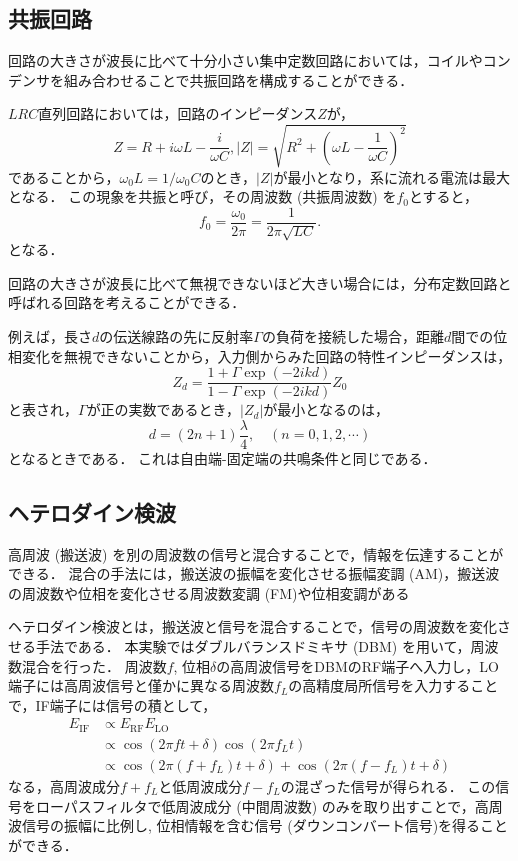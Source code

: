 \documentclass[uplatex,dvipdfmx,a4j,12pt]{jsarticle}
\begin{document}
\subsection{共振回路}
回路の大きさが波長に比べて十分小さい集中定数回路においては，コイルやコンデンサを組み合わせることで共振回路を構成することができる．

$LRC$直列回路においては，回路のインピーダンス$Z$が，
\begin{equation}
  Z = R + i\omega L - \frac{i}{\omega C}, |Z| = \sqrt{R^2 + \left(\omega L - \frac{1}{\omega C}\right)^2}
\end{equation}
であることから，$\omega_0 L = 1/\omega_0 C$のとき，$|Z|$が最小となり，系に流れる電流は最大となる．
この現象を共振と呼び，その周波数 (共振周波数) を$f_0$とすると，
\begin{equation}
  f_0 = \frac{\omega_0}{2\pi} = \frac{1}{2\pi\sqrt{LC}}.\label{eq:resonance_frequency}
\end{equation}
となる．

回路の大きさが波長に比べて無視できないほど大きい場合には，分布定数回路と呼ばれる回路を考えることができる．

例えば，長さ$d$の伝送線路の先に反射率$\Gamma$の負荷を接続した場合，距離$d$間での位相変化を無視できないことから，入力側からみた回路の特性インピーダンスは，
\begin{equation}
  Z_d = \frac{1+\Gamma \exp{(-2ikd)}}{1-\Gamma \exp{(-2ikd)}}Z_0
\end{equation}
と表され，$\Gamma$が正の実数であるとき，$|Z_d|$が最小となるのは，
\begin{equation}
  d = (2n + 1)\frac{\lambda}{4}, \quad (n = 0, 1, 2, \cdots)\label{eq:resonance_length}
\end{equation}
となるときである．
これは自由端-固定端の共鳴条件と同じである．

\subsection{ヘテロダイン検波}
高周波 (搬送波) を別の周波数の信号と混合することで，情報を伝達することができる．
混合の手法には，搬送波の振幅を変化させる振幅変調 (AM)，搬送波の周波数や位相を変化させる周波数変調 (FM)や位相変調がある

ヘテロダイン検波とは，搬送波と信号を混合することで，信号の周波数を変化させる手法である．
本実験ではダブルバランスドミキサ (DBM) を用いて，周波数混合を行った．
周波数$f$, 位相$\delta$の高周波信号をDBMのRF端子へ入力し，LO端子には高周波信号と僅かに異なる周波数$f_L$の高精度局所信号を入力することで，IF端子には信号の積として，
\begin{align}
  E_\mathrm{IF} &\propto E_\mathrm{RF} E_\mathrm{LO} \nonumber \\
  &\propto \cos\left(2\pi f t + \delta\right) \cos\left(2\pi f_L t\right) \nonumber \\
  &\propto \cos\left(2\pi (f + f_L) t + \delta\right) + \cos\left(2\pi (f - f_L) t + \delta\right)
\end{align}
なる，高周波成分$f + f_L$と低周波成分$f - f_L$の混ざった信号が得られる．
この信号をローパスフィルタで低周波成分 (中間周波数) のみを取り出すことで，高周波信号の振幅に比例し, 位相情報を含む信号 (ダウンコンバート信号)を得ることができる．
\end{document}
